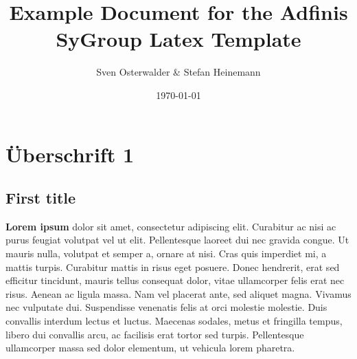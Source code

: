 \documentclass[oneside,DIV12,BCOR0.5cm]{adsyDoc}
\title{Example Document for the Adfinis SyGroup Latex Template}
\author{Sven Osterwalder \& Stefan Heinemann}
\date{\today}
\begin{document}
\maketitle{}
%

\tableofcontents{}

\chapter{Überschrift 1}

\section{First title}

\textbf{Lorem ipsum} dolor sit amet, consectetur adipiscing elit. Curabitur ac nisi ac purus feugiat volutpat vel ut elit. Pellentesque laoreet dui nec gravida congue. Ut mauris nulla, volutpat et semper a, ornare at nisi. Cras quis imperdiet mi, a mattis turpis. Curabitur mattis in risus eget posuere. Donec hendrerit, erat sed efficitur tincidunt, mauris tellus consequat dolor, vitae ullamcorper felis erat nec risus. Aenean ac ligula massa. Nam vel placerat ante, sed aliquet magna. Vivamus nec vulputate dui. Suspendisse venenatis felis at orci molestie molestie. Duis convallis interdum lectus et luctus. Maecenas sodales, metus et fringilla tempus, libero dui convallis arcu, ac facilisis erat tortor sed turpis. Pellentesque ullamcorper massa sed dolor elementum, ut vehicula lorem pharetra.
\end{document}
